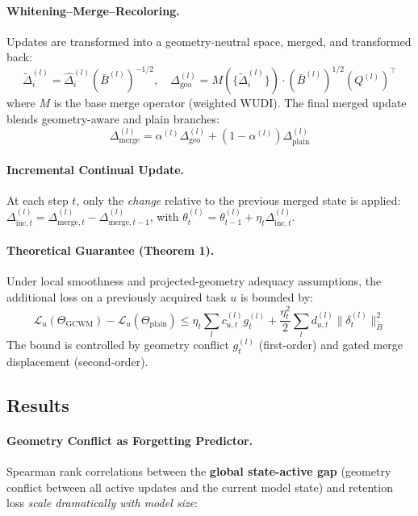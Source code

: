 \documentclass[11pt]{article}
\begin{document}
\paragraph{Whitening--Merge--Recoloring.}
Updates are transformed into a geometry-neutral space, merged, and transformed back:
\begin{equation}
    \tilde{\Delta}_i^{(l)} = \hat{\Delta}_i^{(l)} (\bar{B}^{(l)})^{-1/2}, \quad \Delta_{\mathrm{geo}}^{(l)} = M(\{\tilde{\Delta}_i^{(l)}\}) \cdot (\bar{B}^{(l)})^{1/2} (Q^{(l)})^\top
\end{equation}
where $M$ is the base merge operator (weighted WUDI). The final merged update blends geometry-aware and plain branches:
\begin{equation}
    \Delta_{\mathrm{merge}}^{(l)} = \alpha^{(l)} \Delta_{\mathrm{geo}}^{(l)} + (1 - \alpha^{(l)}) \Delta_{\mathrm{plain}}^{(l)}
\end{equation}

\paragraph{Incremental Continual Update.}
At each step $t$, only the \emph{change} relative to the previous merged state is applied: $\Delta_{\mathrm{inc},t}^{(l)} = \Delta_{\mathrm{merge},t}^{(l)} - \Delta_{\mathrm{merge},t-1}^{(l)}$, with $\theta_t^{(l)} = \theta_{t-1}^{(l)} + \eta_t \Delta_{\mathrm{inc},t}^{(l)}$.

\paragraph{Theoretical Guarantee (Theorem 1).}
Under local smoothness and projected-geometry adequacy assumptions, the additional loss on a previously acquired task $u$ is bounded by:
\begin{equation}
    \mathcal{L}_u(\Theta_{\mathrm{GCWM}}) - \mathcal{L}_u(\Theta_{\mathrm{plain}}) \leq \eta_t \sum_l c_{u,t}^{(l)} g_t^{(l)} + \frac{\eta_t^2}{2} \sum_l d_{u,t}^{(l)} \|\delta_t^{(l)}\|_{\tilde{B}}^2
\end{equation}
The bound is controlled by geometry conflict $g_t^{(l)}$ (first-order) and gated merge displacement (second-order).

\subsection{Results}

\paragraph{Geometry Conflict as Forgetting Predictor.}
Spearman rank correlations between the \textbf{global state-active gap} (geometry conflict between all active updates and the current model state) and retention loss \emph{scale dramatically with model size}:
\end{document}
